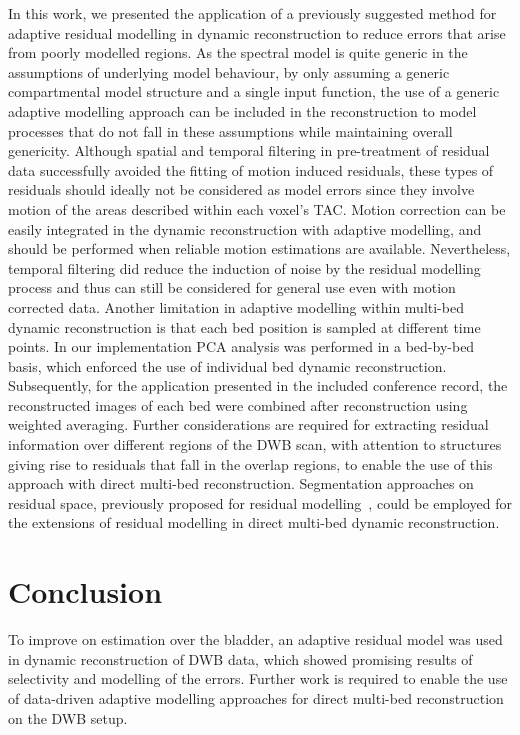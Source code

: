 In this work, we presented the application of a previously suggested method for adaptive residual modelling in dynamic reconstruction to reduce errors that arise from poorly modelled regions. As the spectral model is quite generic in the assumptions of underlying model behaviour, by only assuming a generic compartmental model structure and a single input function, the use of a generic adaptive modelling approach can be included in the reconstruction to model processes that do not fall in these assumptions while maintaining overall genericity. 
Although spatial and temporal filtering in pre-treatment of residual data successfully avoided the fitting of motion induced residuals, these types of residuals should ideally not be considered as model errors since they involve motion of the areas described within each voxel's TAC. Motion correction can be easily integrated in the dynamic reconstruction with adaptive modelling, and should be performed when reliable motion estimations are available. Nevertheless, temporal filtering did reduce the induction of noise by the residual modelling process and thus can still be considered for general use even with motion corrected data.
Another limitation in adaptive modelling within multi-bed dynamic reconstruction is that each bed position is sampled at different time points. In our implementation PCA analysis was performed in a bed-by-bed basis, which enforced the use of individual bed dynamic reconstruction. Subsequently, for the application presented in the included conference record, the reconstructed images of each bed were combined after reconstruction using weighted averaging. Further considerations are required for extracting residual information over different regions of the DWB scan, with attention to structures giving rise to residuals that fall in the overlap regions, to enable the use of this approach with direct multi-bed reconstruction. Segmentation approaches on residual space, previously proposed for residual modelling~\cite{Germino2016}, could be employed for the extensions of residual modelling in direct multi-bed dynamic reconstruction.

\section{Conclusion}
To improve on estimation over the bladder, an adaptive residual model was used in dynamic reconstruction of DWB data, which showed promising results of selectivity and modelling of the errors. Further work is required to enable the use of data-driven adaptive modelling approaches for direct multi-bed reconstruction on the DWB setup. 

